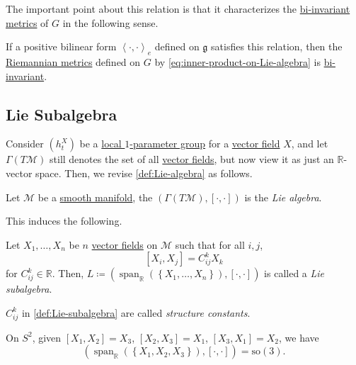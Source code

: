 The important point about this relation is that it characterizes the \hyperref[def:Riemannian-metric-left-invariant]{bi-invariant} \hyperref[def:Riemannian-metric]{metrics} of \(G\) in the following sense.

\begin{remark}
	If a positive bilinear form \(\left\langle \cdot, \cdot \right\rangle _e \) defined on \(\mathfrak{g} \) satisfies this relation, then the \hyperref[def:Riemannian-metric]{Riemannian metrics} defined on \(G\) by \autoref{eq:inner-product-on-Lie-algebra} is \hyperref[def:Riemannian-metric-left-invariant]{bi-invariant}.
\end{remark}

\subsection{Lie Subalgebra}
Consider \((h^X_t)\) be a \hyperref[def:local-1-parameter-group]{local \(1\)-parameter group} for a \hyperref[def:vector-field]{vector field} \(X\), and let \(\Gamma (T\mathcal{M} )\) still denotes the set of all \hyperref[def:vector-field]{vector fields}, but now view it as just an \(\mathbb{R} \)-vector space. Then, we revise \autoref{def:Lie-algebra} as follows.

\begin{definition}\label{def:Lie-algebra*}
	Let \(\mathcal{M} \) be a \hyperref[def:smooth-manifold]{smooth manifold}, the \((\Gamma (T\mathcal{M} ), [\cdot, \cdot])\) is the \emph{Lie algebra}.
\end{definition}

This induces the following.

\begin{definition}\label{def:Lie-subalgebra}
	Let \(X_1, \dots , X_n\) be \(n\) \hyperref[def:vector-field]{vector fields} on \(\mathcal{M} \) such that for all \(i, j\),
	\[
		[X_i, X_j] = C^k_{ij} X_k
	\]
	for \(C^k_{ij}\in \mathbb{R}  \). Then, \(L\coloneqq (\operatorname{span}_\mathbb{R} (\left\{ X_1, \dots , X_n \right\} ), [\cdot, \cdot] )\) is called a \emph{Lie subalgebra}.
\end{definition}

\begin{notation}\label{not:structure-constant}
	\(C^k_{ij} \) in \autoref{def:Lie-subalgebra} are called \emph{structure constants}.
\end{notation}

\begin{eg}
	On \(S^2\), given \([X_1, X_2] = X_3\), \([X_2, X_3] = X_1\), \([X_3, X_1] = X_2\), we have
	\[
		\left( \operatorname{span}\nolimits_{\mathbb{R} }(\left\{ X_1, X_2, X_3 \right\} ), [\cdot, \cdot] \right) = \mathrm{so}(3).
	\]
\end{eg}

